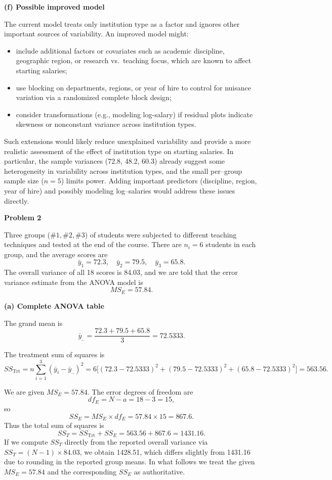 \documentclass[answers,12pt,addpoints]{exam}
\begin{document}
\medskip
\textbf{(f) Possible improved model}

The current model treats only institution type as a factor and ignores other
important sources of variability. An improved model might:

\begin{itemize}
\item include additional factors or covariates such as academic discipline,
geographic region, or research vs.\ teaching focus, which are known to affect
starting salaries;
\item use blocking on departments, regions, or year of hire to control for
nuisance variation via a randomized complete block design;
\item consider transformations (e.g., modeling log-salary) if residual plots
indicate skewness or nonconstant variance across institution types.
\end{itemize}

Such extensions would likely reduce unexplained variability and provide a more
realistic assessment of the effect of institution type on starting salaries.
In particular, the sample variances (72.8, 48.2, 60.3) already suggest some
heterogeneity in variability across institution types, and the small per–group
sample size ($n=5$) limits power. Adding important predictors (discipline,
region, year of hire) and possibly modeling log–salaries would address these
issues directly.

\textbf{Problem 2}

Three groups ($\#1,\#2,\#3$) of students were subjected to different teaching
techniques and tested at the end of the course. There are $n_i = 6$ students in
each group, and the average scores are
\[
\bar{y}_1 = 72.3,\quad \bar{y}_2 = 79.5,\quad \bar{y}_3 = 65.8.
\]
The overall variance of all 18 scores is 84.03, and we are told that the error
variance estimate from the ANOVA model is
\[
MS_E = 57.84.
\]

\medskip
\textbf{(a) Complete ANOVA table}

The grand mean is
\[
\bar{y}_{..} = \frac{72.3 + 79.5 + 65.8}{3} = 72.5333.
\]

The treatment sum of squares is
\[
SS_{\text{Trt}}
= n\sum_{i=1}^3(\bar{y}_i - \bar{y}_{..})^2
= 6\bigl[(72.3-72.5333)^2 + (79.5-72.5333)^2 + (65.8-72.5333)^2\bigr]
= 563.56.
\]

We are given $MS_E = 57.84$. The error degrees of freedom are
\[
df_E = N-a = 18-3 = 15,
\]
so
\[
SS_E = MS_E \times df_E = 57.84 \times 15 = 867.6.
\]
Thus the total sum of squares is
\[
SS_T = SS_{\text{Trt}} + SS_E = 563.56 + 867.6 = 1431.16.
\]
If we compute $SS_T$ directly from the reported overall variance via
$SS_T = (N-1)\times 84.03$, we obtain 1428.51, which differs slightly from
1431.16 due to rounding in the reported group means. In what follows we treat
the given $MS_E = 57.84$ and the corresponding $SS_E$ as authoritative.
\end{document}
